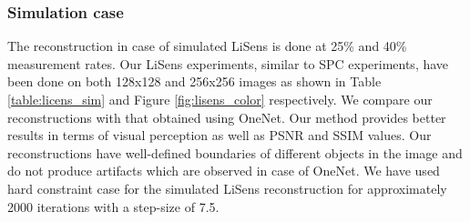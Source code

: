 \documentclass[journal,twoside]{IEEEtran}
\begin{document}
\subsubsection{Simulation case}
 The reconstruction in case of simulated  LiSens is done at 25\% and 40\% measurement rates. Our LiSens experiments, similar to SPC experiments, have been done on both 128x128 and 256x256 images as shown in Table \ref{table:licens_sim} and Figure \ref{fig:lisens_color} respectively. We compare our reconstructions with that obtained using OneNet. Our method provides better results in terms of visual perception as well as PSNR and SSIM values. Our reconstructions have well-defined boundaries of different objects in the image and do not produce artifacts which are observed in case of OneNet. We have used hard constraint case for the simulated LiSens reconstruction for approximately 2000 iterations with a step-size of 7.5.
\end{document}

